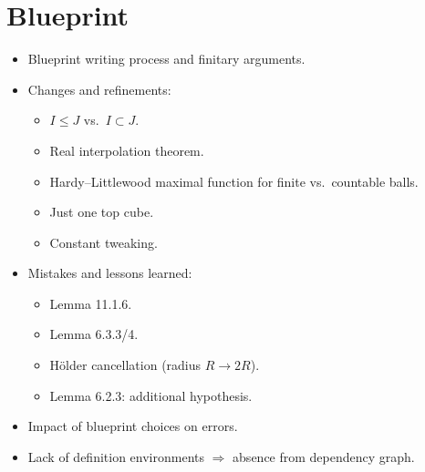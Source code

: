 \documentclass[12pt]{amsart}
\begin{document}
\section{Blueprint}
\begin{itemize}
  \item Blueprint writing process and finitary arguments.
  \item Changes and refinements:
    \begin{itemize}
      \item $I \leq J$ vs.\ $I \subset J$.
      \item Real interpolation theorem.
      \item Hardy--Littlewood maximal function for finite vs.\ countable balls.
      \item Just one top cube.
      \item Constant tweaking.
    \end{itemize}
  \item Mistakes and lessons learned:
    \begin{itemize}
      \item Lemma 11.1.6.
      \item Lemma 6.3.3/4.
      \item Hölder cancellation (radius $R \to 2R$).
      \item Lemma 6.2.3: additional hypothesis.
    \end{itemize}
  \item Impact of blueprint choices on errors.
  \item Lack of definition environments $\Rightarrow$ absence from dependency graph.
\end{itemize}
\end{document}
